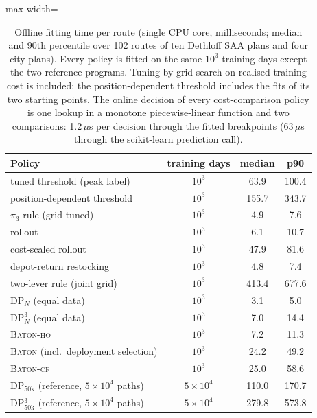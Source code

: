 \begin{table}[t]
\caption{Offline fitting time per route (single CPU core, milliseconds;
median and 90th percentile over 102 routes of ten Dethloff
\textsc{SAA} plans and four city plans). Every policy is fitted on the
same $10^3$ training days except the two reference programs. Tuning by
grid search on realised training cost is included; the
position-dependent threshold includes the fits of its two starting
points. The online decision
of every cost-comparison policy is one lookup in a monotone
piecewise-linear function and two comparisons: 1.2\,$\mu$s per decision through the
fitted breakpoints (63\,$\mu$s through the
scikit-learn prediction call).}
\label{tab:timing}
\centering
\footnotesize
\setlength{\tabcolsep}{3.5pt}
\begin{adjustbox}{max width=\linewidth}
\begin{tabular}{l c cc}
\toprule
Policy & training days & median & p90 \\
\midrule
tuned threshold (peak label) & $10^3$ & 63.9 & 100.4 \\
position-dependent threshold & $10^3$ & 155.7 & 343.7 \\
$\pi_3$ rule (grid-tuned) & $10^3$ & 4.9 & 7.6 \\
rollout & $10^3$ & 6.1 & 10.7 \\
cost-scaled rollout & $10^3$ & 47.9 & 81.6 \\
depot-return restocking & $10^3$ & 4.8 & 7.4 \\
two-lever rule (joint grid) & $10^3$ & 413.4 & 677.6 \\
DP$_N$ (equal data) & $10^3$ & 3.1 & 5.0 \\
DP$^3_N$ (equal data) & $10^3$ & 7.0 & 14.4 \\
\textsc{Baton-ho} & $10^3$ & 7.2 & 11.3 \\
\textsc{Baton} (incl.\ deployment selection) & $10^3$ & 24.2 & 49.2 \\
\textsc{Baton-cf} & $10^3$ & 25.0 & 58.6 \\
DP$_{50\mathrm{k}}$ (reference, $5\times10^4$ paths) & $5\times10^4$ & 110.0 & 170.7 \\
DP$^3_{50\mathrm{k}}$ (reference, $5\times10^4$ paths) & $5\times10^4$ & 279.8 & 573.8 \\
\bottomrule
\end{tabular}
\end{adjustbox}
\end{table}
